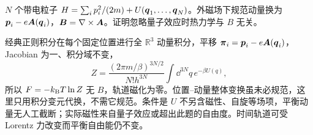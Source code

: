 \begin{exercise}
$N$ 个带电粒子 $H=\sum_i p_i^2/(2m)+U(\boldsymbol{q}_1,\ldots,\boldsymbol{q}_N)$。外磁场下规范动量换为 $\boldsymbol{p}_i-e\boldsymbol{A}(\boldsymbol{q}_i)$，$\boldsymbol{B}=\nabla\times\boldsymbol{A}$。证明忽略量子效应时热力学与 $B$ 无关。
\end{exercise}
\begin{solution}
经典正则积分在每个固定位置进行全 $\mathbb R^3$ 动量积分，平移 $\boldsymbol{\pi}_i=\boldsymbol{p}_i-e\boldsymbol{A}(\boldsymbol{q}_i)$，Jacobian 为一、积分域不变，
\[Z=\frac{(2\pi m/\beta)^{3N/2}}{N!h^{3N}}\int\dd^{3N}q\,e^{-\beta U(q)},\]
所以 $F=-k_{\mathrm B} T\ln Z$ 无 $B$，轨道磁化为零。位置--动量整体变换虽未必规范，这里只用积分变元代换，不需它规范。条件是 $U$ 不另含磁性、自旋等场项，平衡动量无人工截断；实际磁性来自量子效应或超出此题的自由度。时间轨道可受 Lorentz 力改变而平衡自由能仍不变。
\end{solution}
